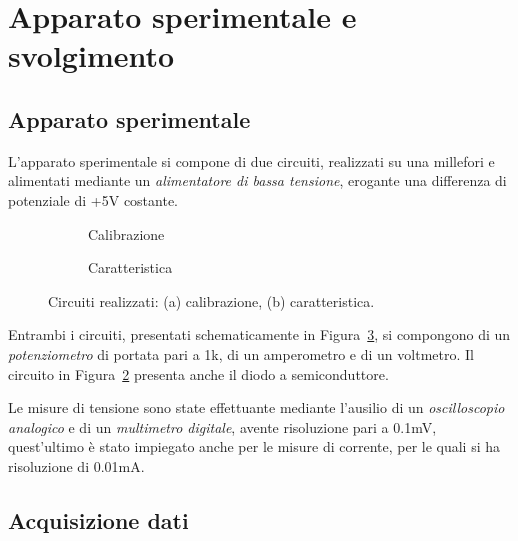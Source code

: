 \documentclass[@MAIN@]{subfiles}
\begin{document}
\section{Apparato sperimentale e svolgimento} \label{sec:acquisizione}

  \subsection{Apparato sperimentale}\label{subsec:apparato-sperimentale}
    L'apparato sperimentale si compone di due circuiti, realizzati su una millefori
    e alimentati mediante un \textit{alimentatore di bassa tensione},
    erogante una differenza di potenziale di +5V costante.

    \begin{figure}[ht]
      \centering
      \begin{subfigure}[b]{0.4\textwidth}
        \centering
        
        \caption{Calibrazione}
        \label{fig:circuito-calibrazione}
      \end{subfigure}
      \hfill
      \begin{subfigure}[b]{0.55\textwidth}
        \centering
        
        \caption{Caratteristica}
        \label{fig:circuito-caratteristica}
      \end{subfigure}
      \caption{Circuiti realizzati: (a) calibrazione, (b) caratteristica.}
      \label{fig:figura_circuiti}
    \end{figure}

    \newpage
    Entrambi i circuiti, presentati schematicamente in Figura~\ref{fig:figura_circuiti}, si compongono di
    un \textit{potenziometro} di portata pari a 1k\textohm, di un amperometro e
    di un voltmetro.
    Il circuito in Figura~\ref{fig:circuito-caratteristica} presenta anche il diodo
    a semiconduttore.

    Le misure di tensione sono state effettuante mediante l'ausilio di un
    \textit{oscilloscopio analogico} e di un \textit{multimetro digitale}, avente
    risoluzione pari a 0.1mV, quest'ultimo è stato impiegato anche per le misure
    di corrente, per le quali si ha risoluzione di 0.01mA.
    \vspace{0.5pt}

  \subsection{Acquisizione dati}\label{subsec:acquisizione-dati}
\end{document}
